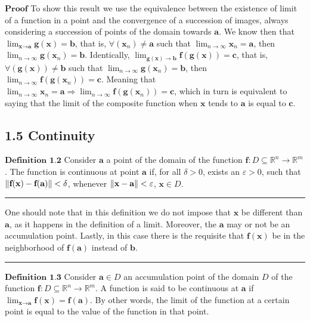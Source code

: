 \documentclass[0pt, a4paper]{article}
\begin{document}
$\textbf{Proof}$ To show this result we use the equivalence between the existence of limit of a function in a point and the convergence of a succession of images, always considering a succession of points of the domain towards $\textbf{a}$. We know then that $\lim_{\textbf{x}\to\textbf{a}} \textbf{g}(\textbf{x})=\textbf{b}$, that is, $\forall(\textbf{x}_n)\neq\textbf{a}$ such that $\lim_{n\to\infty} \textbf{x}_n=\textbf{a}$, then $\lim_{n\to
\infty}\textbf{g}(\textbf{x}_n)=\textbf{b}$. Identically, $\lim_{\textbf{g}(\textbf{x})\to\textbf{b}}\textbf{f}(\textbf{g}(\textbf{x}))=\textbf{c}$, that is, $\forall(\textbf{g}(\textbf{x}))\neq\textbf{b}$ such that $\lim_{n\to\infty}\textbf{g}(\textbf{x}_n)=\textbf{b}$, then $\lim_{n\to\infty}\textbf{f}(\textbf{g}(\textbf{x}_n))=\textbf{c}$. Meaning that $\lim_{n\to\infty}\textbf{x}_n=\textbf{a}\Rightarrow\lim_{n\to\infty}\textbf{f}(\textbf{g}(\textbf{x}_n))=\textbf{c}$, which in turn is equivalent to saying that the limit of the composite function when $\textbf{x}$ tends to $\textbf{a}$ is equal to $\textbf{c}$.



\subsection*{1.5 Continuity}



$\textbf{Definition 1.2}$ Consider $\textbf{a}$ a point of the domain of the function $\textbf{f}: D\subseteq \mathbb{R}^n\to\mathbb{R}^m$. The function is continuous at point $\textbf{a}$ if, for all $\delta>0$, exists an $\varepsilon>0$, such that $\norm{\textbf{f}(\textbf{x})-\textbf{f}(\textbf{a})}<\delta$, whenever $\norm{\textbf{x}-\textbf{a}}<\varepsilon$, $\textbf{x}\in D$.

\noindent\rule{\textwidth}{1pt}

One should note that in this definition we do not impose that $\textbf{x}$ be different than $\textbf{a}$, as it happens in the definition of a limit. Moreover, the $\textbf{a}$ may or not be an accumulation point. Lastly, in this case there is the requisite that $\textbf{f}(\textbf{x})$ be in the neighborhood of $\textbf{f}(\textbf{a})$ instead of $\textbf{b}$.

\noindent\rule{\textwidth}{1pt}

$\textbf{Definition 1.3}$ Consider $\textbf{a}\in D$ an accumulation point of the domain $D$ of the function $\textbf{f}:D\subseteq \mathbb{R}^n \to \mathbb{R}^m$. A function is said to be continuous at $\textbf{a}$ if $\lim_{\textbf{x}\to \textbf{a}} \textbf{f}(\textbf{x})  = \textbf{f}(\textbf{a})$. By other words, the limit of the function at a certain point is equal to the value of the function in that point. 
\end{document}
